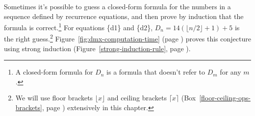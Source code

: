 Sometimes it's possible to guess a closed-form formula
for the numbers in a sequence defined by recurrence equations,
and then prove by induction that the formula is
correct.\footnote{A
\label{footnote:closed-form}closed-form formula
for $D_n$ is a formula
that doesn't refer to $D_m$ for any $m$.}
For equations \{d1\} and \{d2\},
$D_{n} = 14(\lfloor n/2\rfloor + 1) + 5$ is the right guess.\footnote{We
will use floor brackets $\lfloor x\rfloor$ and ceiling brackets $\lceil x\rceil$
(Box~\ref{floor-ceiling-ops-brackets}, page \pageref{floor-ceiling-ops-brackets})
extensively in this chapter.}
Figure~\ref{fig:dmx-computation-time}
(page \pageref{fig:dmx-computation-time}) proves
this conjecture using strong induction
(Figure~\ref{strong-induction-rule}, page \pageref{strong-induction-rule}).

